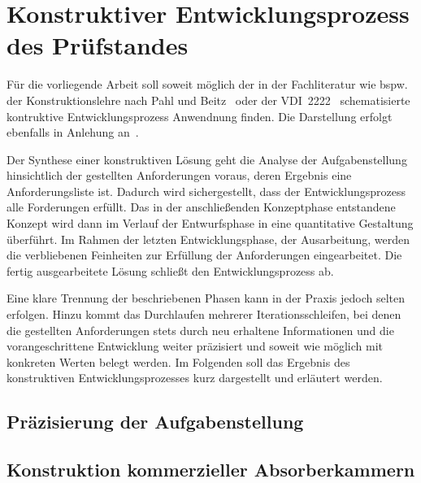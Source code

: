 

\chapter{Konstruktiver Entwicklungsprozess des Prüfstandes}\label{cha:3}

Für die vorliegende Arbeit soll soweit möglich der in der Fachliteratur wie bspw. der Konstruktionslehre nach Pahl und Beitz~\cite{Pahl_Beitz_Konstruktionslehre} oder der VDI~2222~\cite{VDI_2222-1} schematisierte kontruktive Entwicklungsprozess Anwendnung finden. Die Darstellung erfolgt ebenfalls in Anlehung an~\cite{Projektarbeit}.
\par
\vspace{\linespace}
Der Synthese einer konstruktiven Lösung geht die Analyse der Aufgabenstellung hinsichtlich der gestellten Anforderungen voraus, deren Ergebnis eine Anforderungsliste ist. Dadurch wird sichergestellt, dass der Entwicklungsprozess alle Forderungen erfüllt. Das in der anschließenden Konzeptphase entstandene Konzept wird dann im Verlauf der Entwurfsphase in eine quantitative Gestaltung überführt. Im Rahmen der letzten Entwicklungsphase, der Ausarbeitung, werden die verbliebenen Feinheiten zur Erfüllung der Anforderungen eingearbeitet. Die fertig ausgearbeitete Lösung schließt den Entwicklungsprozess ab.
\par
\vspace{\linespace}
Eine klare Trennung der beschriebenen Phasen kann in der Praxis jedoch selten erfolgen. Hinzu kommt das Durchlaufen mehrerer Iterationsschleifen, bei denen die gestellten Anforderungen stets durch neu erhaltene Informationen und die vorangeschrittene Entwicklung weiter präzisiert und soweit wie möglich mit konkreten Werten belegt werden. Im Folgenden soll das Ergebnis des konstruktiven Entwicklungsprozesses kurz dargestellt und erläutert werden.   


\section{Präzisierung der Aufgabenstellung}\label{cha:3_Praezisierung_Aufgabenstellung}





\section{Konstruktion kommerzieller Absorberkammern}\label{cha:3_Konstruktion_kommerzieller_Absorberkammern}

